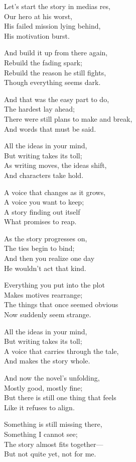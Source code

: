 \begin{lyrics}
Let's start the story in medias res,\\
Our hero at his worst,\\
His failed mission lying behind,\\
His motivation burst.

And build it up from there again,\\
Rebuild the fading spark;\\
Rebuild the reason he still fights,\\
Though everything seems dark.

And that was the easy part to do,\\
The hardest lay ahead;\\
There were still plans to make and break,\\
And words that must be said.

All the ideas in your mind,\\
But writing takes its toll;\\
As writing moves, the ideas shift,\\
And characters take hold.

A voice that changes as it grows,\\
A voice you want to keep;\\
A story finding out itself\\
What promises to reap.

As the story progresses on,\\
The ties begin to bind;\\
And then you realize one day\\
He wouldn't act that kind.

Everything you put into the plot\\
Makes motives rearrange;\\
The things that once seemed obvious\\
Now suddenly seem strange.

All the ideas in your mind,\\
But writing takes its toll;\\
A voice that carries through the tale,\\
And makes the story whole.

And now the novel's unfolding,\\
Mostly good, mostly fine;\\
But there is still one thing that feels\\
Like it refuses to align.

Something is still missing there,\\
Something I cannot see;\\
The story almost fits together—\\
But not quite yet, not for me.
\end{lyrics}

